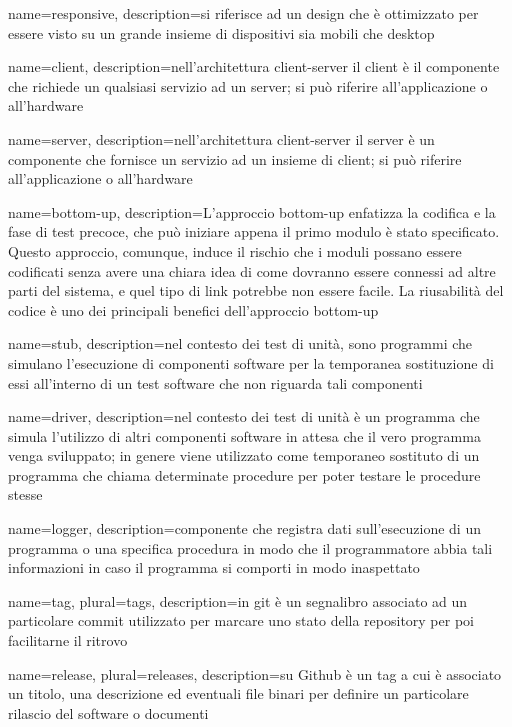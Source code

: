  {
	name=responsive,
	description={si riferisce ad un design che è ottimizzato per essere visto su un grande insieme di dispositivi sia mobili che desktop}
}

 {
	name=client,
	description={nell'architettura client-server il client è il componente che richiede un qualsiasi servizio ad un server; si può riferire all'applicazione o all'hardware}
}

 {
	name=server,
	description={nell'architettura client-server il server è un componente che fornisce un servizio ad un insieme di client; si può riferire all'applicazione o all'hardware}
}

 {
	name=bottom-up,
	description={L'approccio bottom-up enfatizza la codifica e la fase di test precoce, che può iniziare appena il primo modulo è stato specificato. Questo approccio, comunque, induce il rischio che i moduli possano essere codificati senza avere una chiara idea di come dovranno essere connessi ad altre parti del sistema, e quel tipo di link potrebbe non essere facile. La riusabilità del codice è uno dei principali benefici dell'approccio bottom-up}
}

 {
	name=stub,
	description={nel contesto dei test di unità, sono programmi che simulano l'esecuzione di componenti software per la temporanea sostituzione di essi all'interno di un test software che non riguarda tali componenti}
}

 {
    name=driver,
    description={nel contesto dei test di unità è un programma che simula l'utilizzo di altri componenti software in attesa che il vero programma venga sviluppato; in genere viene utilizzato come temporaneo sostituto di un programma che chiama determinate procedure per poter testare le procedure stesse}
}

 {
    name=logger,
    description={componente che registra dati sull'esecuzione di un programma o una specifica procedura in modo che il programmatore abbia tali informazioni in caso il programma si comporti in modo inaspettato}
}

 {
    name=tag,
    plural=tags,
    description={in git è un segnalibro associato ad un particolare commit utilizzato per marcare uno stato della repository per poi facilitarne il ritrovo}
}

 {
    name=release,
    plural=releases,
    description={su Github è un tag a cui è associato un titolo, una descrizione ed eventuali file binari per definire un particolare rilascio del software o documenti}
}
